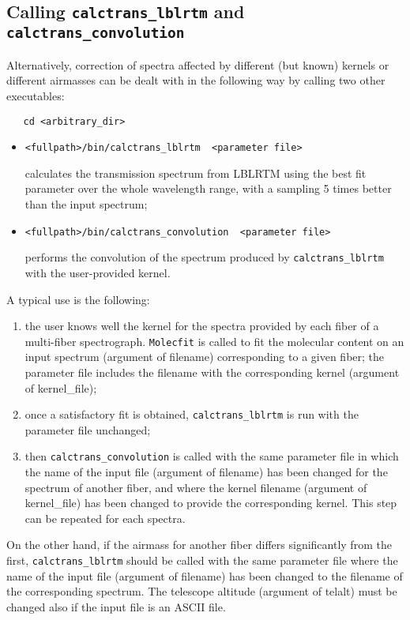 \subsection{Calling {\tt calctrans\_lblrtm} and {\tt calctrans\_convolution}}\label{sec:callingct2}

Alternatively, correction of spectra affected by different (but known)
kernels or different airmasses can  be dealt with in  the following way by  calling two other
executables:
\begin{verbatim}
   cd <arbitrary_dir>
\end{verbatim}
\begin{itemize}
\item 
\begin{verbatim}
<fullpath>/bin/calctrans_lblrtm  <parameter file>
\end{verbatim}
  calculates  the transmission  spectrum from LBLRTM
  using the best fit parameter over the whole wavelength range, with a
  sampling 5 times better than the input spectrum;
\item 
\begin{verbatim}
<fullpath>/bin/calctrans_convolution  <parameter file>
\end{verbatim}
performs the  convolution of  the
  spectrum produced by  {\tt calctrans\_lblrtm} with  the user-provided kernel.
\end{itemize}

A typical use is the following:
\begin{enumerate}
\item the user knows well the  kernel for the spectra provided by each
  fiber of  a multi-fiber spectrograph.   {\tt Molecfit} is  called to
  fit the  molecular content  on an input  spectrum (argument  of {\sc
    filename})  corresponding to  a  given fiber;  the parameter  file
  includes  the filename  with the  corresponding kernel  (argument of
  {\sc kernel\_file});
\item once a satisfactory fit is obtained, {\tt calctrans\_lblrtm} is
  run with the parameter file unchanged;
\item then {\tt calctrans\_convolution} is called with the same
  parameter file in which the name of the input file (argument of
  {\sc filename}) has been changed for the spectrum of another fiber, and
  where the kernel filename (argument of {\sc kernel\_file}) has been changed
  to provide the corresponding kernel. This step can be repeated for each
  spectra.
\end{enumerate}
On  the  other  hand,  if   the  airmass  for  another  fiber  differs
significantly from the first, {\tt calctrans\_lblrtm} should be called
with  the  same parameter  file  where  the  name  of the  input  file
(argument of {\sc  filename}) has been changed to the  filename of the
corresponding  spectrum.  The  telescope altitude  (argument  of  {\sc
  telalt}) must be changed also if the input file is an ASCII file.




